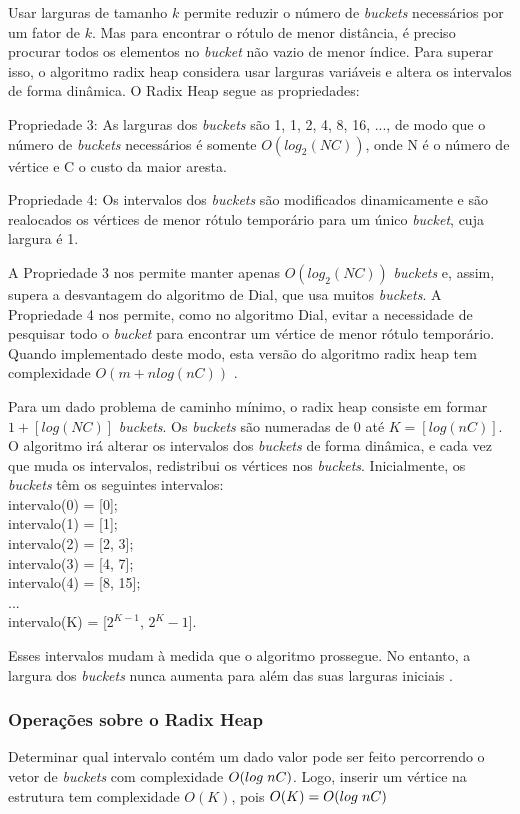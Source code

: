 Usar larguras de tamanho $k$ permite reduzir o número de \textit{buckets} necessários por um fator de $k$.
Mas para encontrar o rótulo de menor distância, é preciso procurar todos os elementos no \textit{bucket} não vazio de menor índice.
Para superar isso, o algoritmo radix heap considera usar larguras variáveis e altera os intervalos de forma dinâmica. 
O Radix Heap segue as pro\-prie\-dades:

Propriedade 3: As larguras dos \textit{buckets} são 1, 1, 2, 4, 8, 16, ..., de modo que o número de \textit{buckets} necessários
é somente $O(log_2(NC))$, onde N é o número de vértice e C o custo da maior aresta.

Propriedade 4: Os intervalos dos \textit{buckets} são modificados dinamicamente e são realocados os vértices de menor rótulo temporário
para um único \textit{bucket}, cuja largura é 1.

A Propriedade 3 nos permite manter apenas $O(log_2(NC))$ \textit{buckets} e, assim, supera a desvantagem do algoritmo
de Dial, que usa muitos \textit{buckets}.
A Propriedade 4 nos permite, como no algoritmo Dial, evitar a necessidade de 
pesquisar todo o \textit{bucket} para encontrar um vértice de menor rótulo temporário. Quando implementado deste modo, esta 
versão do algoritmo radix heap tem complexidade $O(m + nlog(nC))$ \cite{bookahuja}.

Para um dado problema de caminho mínimo, o radix heap consiste em formar $1 + [log(NC)]$ \textit{buckets}.
Os \textit{buckets} são numeradas de $0$ até $K = [log(nC)]$.
O algoritmo irá alterar os intervalos dos \textit{buckets} de forma dinâmica, e cada vez que muda os intervalos,
redistribui os vértices nos \textit{buckets}. Inicialmente, os \textit{buckets} têm os seguintes intervalos:\\
intervalo(0) = [0];\\
intervalo(1) = [1];\\
intervalo(2) = [2, 3];\\
intervalo(3) = [4, 7];\\
intervalo(4) = [8, 15];\\
...\\
intervalo(K) = [$2^{K - 1}$, $2^K - 1$].

Esses intervalos mudam à medida que o algoritmo prossegue. No entanto, a largura dos \textit{buckets} nunca aumenta
para além das suas larguras iniciais \cite{bookahuja}.

\subsubsection{Operações sobre o Radix Heap}
Determinar qual intervalo contém um dado valor pode ser feito percorrendo o vetor de \textit{buckets} com complexidade $O(log \hspace*{1mm} nC)$.
Logo, inserir um vértice na estrutura tem complexidade $O(K)$, pois $O(K) = O(log \hspace*{1mm} nC)$

